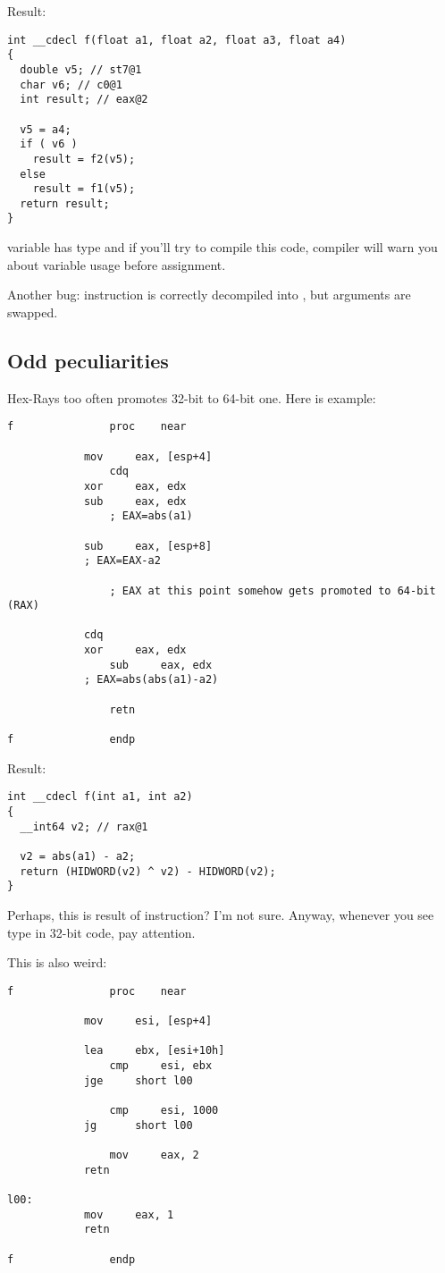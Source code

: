 Result:

\begin{lstlisting}
int __cdecl f(float a1, float a2, float a3, float a4)
{
  double v5; // st7@1
  char v6; // c0@1
  int result; // eax@2

  v5 = a4;
  if ( v6 )
    result = f2(v5);
  else
    result = f1(v5);
  return result;
}
\end{lstlisting}

 variable has  type and if you'll try to compile this code, compiler will warn you about variable
usage before assignment.

Another bug:  instruction is correctly decompiled into , but arguments are swapped.

\subsection{Odd peculiarities}

Hex-Rays too often promotes 32-bit  to 64-bit one.
Here is example:

\begin{lstlisting}
f               proc    near

	        mov     eax, [esp+4]
                cdq
	        xor     eax, edx
        	sub     eax, edx
                ; EAX=abs(a1)

	        sub     eax, [esp+8]
        	; EAX=EAX-a2

                ; EAX at this point somehow gets promoted to 64-bit (RAX)

	        cdq
        	xor     eax, edx
                sub     eax, edx
	        ; EAX=abs(abs(a1)-a2)

                retn

f               endp
\end{lstlisting}

Result:

\begin{lstlisting}
int __cdecl f(int a1, int a2)
{
  __int64 v2; // rax@1

  v2 = abs(a1) - a2;
  return (HIDWORD(v2) ^ v2) - HIDWORD(v2);
}
\end{lstlisting}

Perhaps, this is result of  instruction? I'm not sure.
Anyway, whenever you see  type in 32-bit code, pay attention.

This is also weird:

\begin{lstlisting}
f               proc    near

	        mov     esi, [esp+4]

        	lea     ebx, [esi+10h]
                cmp     esi, ebx
	        jge     short l00

                cmp     esi, 1000
	        jg      short l00

                mov     eax, 2
	        retn

l00:
	        mov     eax, 1
        	retn

f               endp
\end{lstlisting}

